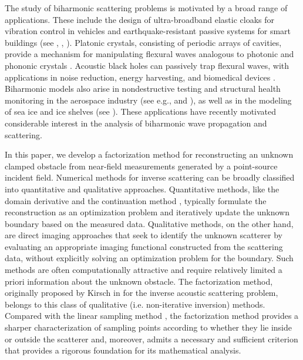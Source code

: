 \documentclass{article}
\begin{document}
The study of biharmonic scattering problems is motivated by a broad range of applications. These include the design of ultra-broadband elastic cloaks for vibration control in vehicles and earthquake-resistant passive systems for smart buildings (see \cite{Farhat1}, \cite{Farhat2}, \cite{Farhat3}). Platonic crystals, consisting of periodic arrays of cavities, provide a mechanism for manipulating flexural waves analogous to photonic and phononic crystals \cite{Farhat0}. Acoustic black holes can passively trap flexural waves, with applications in noise reduction, energy harvesting, and biomedical devices \cite{Pelat2020}. Biharmonic models also arise in nondestructive testing and structural health monitoring in the aerospace industry (see e.g., \cite{Wang2022} and \cite{Zhou2022}), as well as in the modeling of sea ice and ice shelves (see \cite{Askham2025}). These applications have recently motivated considerable interest in the analysis of biharmonic wave propagation and scattering.

In this paper, we develop a factorization method for reconstructing an unknown clamped obstacle from near-field measurements generated by a point-source incident field. Numerical methods for inverse scattering can be broadly classified into quantitative and qualitative approaches. Quantitative methods, like the domain derivative \cite{Fink2024} and the continuation method \cite{Bao2007}, typically formulate the reconstruction as an optimization problem and iteratively update the unknown boundary based on the measured data. Qualitative methods, on the other hand, are direct imaging approaches that seek to identify the unknown scatterer by evaluating an appropriate imaging functional constructed from the scattering data, without explicitly solving an optimization problem for the boundary. Such methods are often computationally attractive and require relatively limited a priori information about the unknown obstacle. The factorization method, originally proposed by Kirsch in \cite{Kirsch1998} for the inverse acoustic scattering problem, belongs to this class of qualitative (i.e. non-iterative inversion) methods. Compared with the linear sampling method \cite{ColtonKirsch1996}, the factorization method provides a sharper characterization of sampling points according to whether they lie inside or outside the scatterer and, moreover, admits a necessary and sufficient criterion that provides a rigorous foundation for its mathematical analysis.
\end{document}
